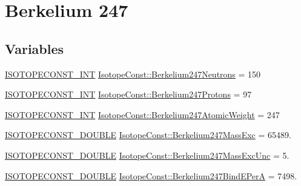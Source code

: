 \hypertarget{group___isotope_const-_berkelium-_bk247}{}\section{Berkelium 247}
\label{group___isotope_const-_berkelium-_bk247}
\subsection*{Variables}
\begin{DoxyCompactItemize}
\item 
\mbox{\hyperlink{group___isotope_const-_macros_ga5f18360b3e99483a35c32d789e62621c}{I\+S\+O\+T\+O\+P\+E\+C\+O\+N\+S\+T\+\_\+\+I\+NT}} \mbox{\hyperlink{group___isotope_const-_berkelium-_bk247_ga4368e1f287744dd6c74521cd96010827}{Isotope\+Const\+::\+Berkelium247\+Neutrons}} = 150
\item 
\mbox{\hyperlink{group___isotope_const-_macros_ga5f18360b3e99483a35c32d789e62621c}{I\+S\+O\+T\+O\+P\+E\+C\+O\+N\+S\+T\+\_\+\+I\+NT}} \mbox{\hyperlink{group___isotope_const-_berkelium-_bk247_gae31c71165b21362d55a1c1ae4fb8d152}{Isotope\+Const\+::\+Berkelium247\+Protons}} = 97
\item 
\mbox{\hyperlink{group___isotope_const-_macros_ga5f18360b3e99483a35c32d789e62621c}{I\+S\+O\+T\+O\+P\+E\+C\+O\+N\+S\+T\+\_\+\+I\+NT}} \mbox{\hyperlink{group___isotope_const-_berkelium-_bk247_ga1c449482bb3133f6a320011898959978}{Isotope\+Const\+::\+Berkelium247\+Atomic\+Weight}} = 247
\item 
\mbox{\hyperlink{group___isotope_const-_macros_ga8f45a7272ce02c0b4c65c44636ed719a}{I\+S\+O\+T\+O\+P\+E\+C\+O\+N\+S\+T\+\_\+\+D\+O\+U\+B\+LE}} \mbox{\hyperlink{group___isotope_const-_berkelium-_bk247_gab03ddb5f41857f4b00153ce704f20b7d}{Isotope\+Const\+::\+Berkelium247\+Mass\+Exc}} = 65489.
\item 
\mbox{\hyperlink{group___isotope_const-_macros_ga8f45a7272ce02c0b4c65c44636ed719a}{I\+S\+O\+T\+O\+P\+E\+C\+O\+N\+S\+T\+\_\+\+D\+O\+U\+B\+LE}} \mbox{\hyperlink{group___isotope_const-_berkelium-_bk247_ga701247da147e42e6645a3b2cc1881e4e}{Isotope\+Const\+::\+Berkelium247\+Mass\+Exc\+Unc}} = 5.
\item 
\mbox{\hyperlink{group___isotope_const-_macros_ga8f45a7272ce02c0b4c65c44636ed719a}{I\+S\+O\+T\+O\+P\+E\+C\+O\+N\+S\+T\+\_\+\+D\+O\+U\+B\+LE}} \mbox{\hyperlink{group___isotope_const-_berkelium-_bk247_gaa6b13ca91b140bfcf9e5a4d6e40f1d0f}{Isotope\+Const\+::\+Berkelium247\+Bind\+E\+PerA}} = 7498.
\item 

\end{DoxyCompactItemize}
